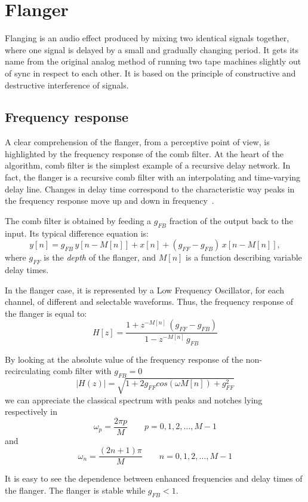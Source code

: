 \section{Flanger}\label{sec:flanger}

Flanging is an audio effect produced by mixing two identical signals together, where one signal is delayed by a small and gradually changing period.
It gets its name from the original analog method of running two tape machines slightly out of sync in respect to each other.
It is based on the principle of constructive and destructive interference of signals.

\subsection{Frequency response}\label{sec:combfilt}

A clear comprehension of the flanger, from a perceptive point of view, is highlighted by the frequency response of the comb filter.
At the heart of the algorithm, comb filter is the simplest example of a recursive delay network.
In fact, the flanger is a recursive comb filter with an interpolating and time-varying delay line.
Changes in delay time correspond to the characteristic way peaks in the frequency response move up and down in frequency~\cite{puckette2006theory}.

The comb filter is obtained by feeding a $g_{FB}$ fraction of the output back to the input. Its typical difference equation is:
\[
y[n] = g_{FB} \, y[n - M[n]] + x[n] + (g_{FF} - g_{FB}) \, x[n - M[n]],
\]
where $g_{FF}$ is the \emph{depth} of the flanger, and $M[n]$ is a function describing variable delay times.

In the flanger case, it is represented by a Low Frequency Oscillator, for each channel, of different and selectable waveforms. Thus, the frequency response of the flanger is equal to:
\[
	H[z] = \frac{1 + z^{
			-M[n]} \, \left( g_{FF} - g_{FB} \right)
	}{
		1 - z^{-M[n]} \, g_{FB}
	}
\]

By looking at the absolute value of the frequency response of the non-recirculating comb filter with $g_{FB} = 0$
\[
|H(z)| = \sqrt{ 1 + 2g_{FF} cos(\omega M[n]) + g_{FF}^2}
\]
we can appreciate the classical spectrum with peaks and notches lying respectively in 
\[
\omega_p = \frac{2 \pi p}{M} \qquad  p = 0, 1, 2, \dots, M-1
\]
and 
\[
\omega_n = \frac{(2n+1) \pi}{M} \qquad n = 0, 1, 2, \dots, M-1
\]

It is easy to see the dependence between enhanced frequencies and delay times of the flanger. The flanger is stable while $g_{FB} < 1$.

